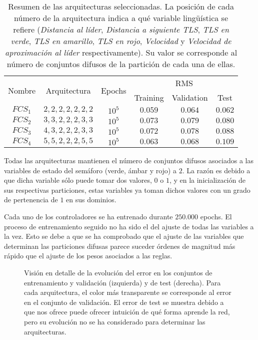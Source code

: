 \begin{table}
	\caption[Resumen de las arquitecturas \ac{fcs} para el modelo longitudinal]{Resumen de las arquitecturas seleccionadas. La posición de cada número de la arquitectura indica a qué variable lingüística se refiere (\textit{Distancia al líder}, \textit{Distancia a siguiente TLS}, \textit{TLS en verde}, \textit{TLS en amarillo}, \textit{TLS en rojo}, \textit{Velocidad} y \textit{Velocidad de aproximación al líder} respectivamente). Su valor se corresponde al número de conjuntos difusos de la partición de cada una de ellas.}
	\label{tbl:cf-fcs-architectures}
	\begin{tabular}{cccccc}
		\hline
		\multirow{2}{*}{Nombre} & \multirow{2}{*}{Arquitectura} & \multirow{2}{*}{Epochs} & \multicolumn{3}{c}{RMS}      \\ 
		&                            &                                          & Training & Validation & Test \\ \hline
		$FCS_1$ & $2, 2, 2, 2, 2, 2, 2$ & $10^5$ & $0.059$ & $0.064$ & $0.062$  \\
		$FCS_2$ & $3, 3, 2, 2, 2, 3, 3$ & $10^5$ & $0.073$ & $0.079$ & $0.080$  \\
		$FCS_3$ & $4, 3, 2, 2, 2, 3, 3$ & $10^5$ & $0.072$ & $0.078$ & $0.088$  \\
		$FCS_4$ & $5, 5, 2, 2, 2, 5, 5$ & $10^5$ & $0.063$ & $0.068$ & $0.109$  \\ \hline
	\end{tabular}
\end{table}

Todas las arquitecturas mantienen el número de conjuntos difusos asociados a las variables de estado del semáforo (verde, ámbar y rojo) a $2$. La razón es debido a que dicha variable sólo puede tomar dos valores, $0$ o $1$, y en la inicialización de sus respectivas particiones, estas variables ya toman dichos valores con un grado de pertenencia de $1$ en sus dominios.

Cada uno de los controladores se ha entrenado durante $250.000$ epochs. El proceso de entrenamiento seguido no ha sido el del ajuste de todas las variables a la vez. Esto se debe a que se ha comprobado que el ajuste de las variables que determinan las particiones difusas parece suceder órdenes de magnitud más rápido que el ajuste de los pesos asociados a las reglas.

\begin{figure}[t]
	\centering
	\qquad
	\caption[Evolución del error durante el entrenamiento en las arquitecturas de \ac{fcs} para el modelo longitudinal]{Visión en detalle de la evolución del error en los conjuntos de entrenamiento y validación (izquierda) y de test (derecha). Para cada arquitectura, el color más transparente se corresponde al error en el conjunto de validación. El error de test se muestra debido a que nos ofrece puede ofrecer intuición de qué forma aprende la red, pero su evolución no se ha considerado para determinar las arquitecturas.}
	\label{fig:lm-fcs-rmse-all-comparisons}
\end{figure}

